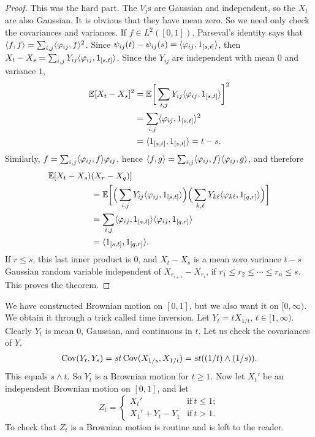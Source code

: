 \begin{proof}
This was the hard part. The $V_j$s are Gaussian and independent, so the $X_t$ are also Gaussian. It is obvious that they have mean zero. So we need only check the covariances and variances. If $f \in L^2([0,1])$, Parseval's identity says that $\langle f,f \rangle = \sum_{i,j}\langle \varphi_{ij},f \rangle^2$. Since $\psi_{ij}(t) - \psi_{ij}(s) = \langle \varphi_{ij},1_{[s,t]} \rangle$, then $X_t - X_s = \sum_{i,j}Y_{ij}\langle \varphi_{ij},1_{[s,t]} \rangle$. Since the $Y_{ij}$ are independent with mean $0$ and variance $1$,
\begin{align*}
    \mathbb{E}[X_t - X_s]^2 &= \mathbb{E}\bigg[\sum_{i,j}Y_{ij}\langle \varphi_{ij},1_{[s,t]} \rangle\bigg]^2 \\
    &= \sum_{i,j}\langle \varphi_{ij},1_{[s,t]} \rangle^2 \\
    &= \langle 1_{[s,t]},1_{[s,t]} \rangle = t-s.
\end{align*}
Similarly, $f = \sum_{i,j}\langle \varphi_{ij},f \rangle\varphi_{ij}$, hence $\langle f,g \rangle = \sum_{i,j}\langle \varphi_{ij},f \rangle\langle \varphi_{ij},g \rangle$, and therefore
\begin{align*}
    \mathbb{E}[X_t - X_s)&(X_r - X_q)] \\
    &= \mathbb{E}\bigg[\Big(\sum_{i,j}Y_{ij}\langle \varphi_{ij},1_{[s,t]} \rangle\Big)\Big(\sum_{k,\ell}Y_{k\ell}\langle \varphi_{k\ell},1_{[q,r]} \rangle\Big)\bigg] \\
    &= \sum_{i,j}\langle \varphi_{ij},1_{[s,t]} \rangle\langle \varphi_{ij},1_{[q,r]} \rangle \\
    &= \langle 1_{[s,t]},1_{[q,r]} \rangle.
\end{align*}
If $r \leq s$, this last inner product is $0$, and $X_t - X_s$ is a mean zero variance $t-s$ Gaussian random variable independent of $X_{r_{i+1}} - X_{r_i}$, if $r_1 \leq r_2 \leq \cdots \leq r_n \leq s$. This proves the theorem.
\end{proof}

We have constructed Brownian motion on $[0,1]$, but we also want it on $[0,\infty)$. We obtain it through a trick called time inversion. Let $Y_t = tX_{1/t}$, $t \in [1,\infty)$. Clearly $Y_t$ is mean $0$, Gaussian, and continuous in $t$. Let us check the covariances of $Y$.
\mpagebreak
\begin{align*}
    \operatorname{Cov}(Y_t,Y_s) = st\operatorname{Cov}(X_{1/s},X_{1/t}) = st((1/t) \wedge (1/s)).
\end{align*}
This equals $s \wedge t$. So $Y_t$ is a Brownian motion for $t \geq 1$. Now let $X_t'$ be an independent Brownian motion on $[0,1]$, and let
\[
    Z_t = \begin{cases}
        X_t' & \text{if}~t \leq 1;\\
        X_1' + Y_t - Y_1 & \text{if}~t > 1.
    \end{cases}
\]
To check that $Z_t$ is a Brownian motion is routine and is left to the reader.

